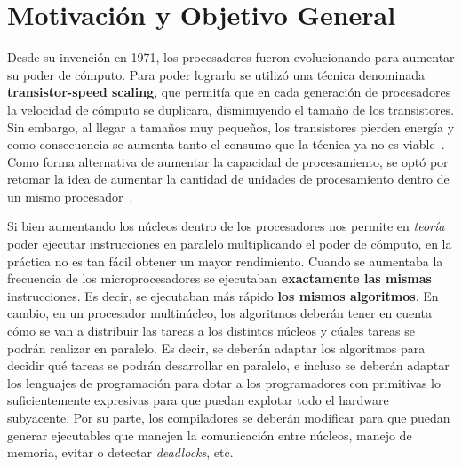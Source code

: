 \section{Motivación y Objetivo General}
\iffalse
Explique el problema o situación de referencia en el que se desarrolla la
propuesta o los interrogantes en el campo disciplinario a los que la propuesta se
dirige. Desarrolle la importancia e impacto de los objetivos y el conocimiento
que se generará. En esta sección no es necesario describir las tareas específicas
que se realizarán (para eso, ver Objetivos específicos).
\fi



Desde su invenci\'on en 1971, los procesadores fueron evolucionando
para aumentar su poder de c\'omputo.
Para poder lograrlo se utiliz\'o una t\'ecnica denominada
\textbf{transistor-speed scaling}, que permit\'ia que en cada
generaci\'on de procesadores la velocidad de c\'omputo se duplicara,
disminuyendo el tama\~no de los transistores. Sin embargo, al llegar a
tama\~nos muy peque\~nos, los transistores pierden energ\'ia y como
consecuencia se aumenta tanto el consumo que la t\'ecnica ya no es
viable~\parencite{Borkar:2011:FM:1941487.1941507}. Como forma
alternativa de aumentar la capacidad de procesamiento, se opt\'o por
retomar la idea de aumentar la cantidad de unidades de procesamiento
dentro de un mismo
procesador~\parencite{Noguchi:1975:DCH:1499949.1500062}.

Si bien aumentando los n\'ucleos dentro de los procesadores nos
permite en \textit{teor\'ia} poder ejecutar instrucciones en paralelo
multiplicando el poder de c\'omputo, en la pr\'actica no es tan
f\'acil obtener un mayor rendimiento.  Cuando se aumentaba la
frecuencia de los microprocesadores se ejecutaban \textbf{exactamente
  las mismas} instrucciones. Es decir, se ejecutaban m\'as r\'apido
\textbf{los mismos algoritmos}. En cambio, en un procesador
multin\'ucleo, los algoritmos deber\'an tener en cuenta c\'omo se van
a distribuir las tareas a los distintos n\'ucleos y c\'uales tareas se
podr\'an realizar en paralelo. Es decir, se deber\'an adaptar
los algoritmos para decidir qu\'e tareas se podr\'an desarrollar en
paralelo, e incluso se deber\'an adaptar los lenguajes de
programaci\'on para dotar a los programadores con primitivas lo
suficientemente expresivas para que puedan explotar todo el hardware
subyacente. Por su parte, los compiladores se deber\'an modificar para
que puedan generar ejecutables que manejen la comunicaci\'on entre
n\'ucleos, manejo de memoria, evitar o detectar \textit{deadlocks},
etc.

